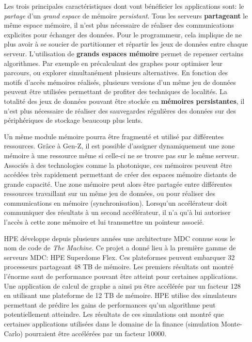         Les trois principales caractéristiques dont vont bénéficier les applications sont: le \textit{partage} d'un \textit{grand espace} de mémoire \textit{persistant}. 
        Tous les serveurs \textbf{partageant} le même espace mémoire, il n'est plus nécessaire de réaliser des communications explicites pour échanger des données. Pour le programmeur, cela implique de ne plus avoir à se soucier de partitionner et répartir les jeux de données entre chaque serveur. 
        L'utilisation de \textbf{grands espaces mémoire} permet de repenser certains algorithmes. Par exemple en précalculant des graphes pour optimiser leur parcours, ou explorer simultanément plusieurs alternatives. En fonction des motifs d'accès mémoires réalisés, plusieurs versions d'un même jeu de données peuvent être utilisées permettant de profiter des techniques de localités.
        La totalité des jeux de données pouvant être stockée en \textbf{mémoires persistantes}, il n'est plus nécessaire de réaliser des sauvegardes régulières des données sur des périphériques de stockage beaucoup plus lents.

        Un même module mémoire pourra être fragmenté et utilisé par différentes ressources. Grâce à Gen-Z, il est possible d'assigner dynamiquement une zone mémoire à une ressource même si celle-ci ne se trouve pas sur le même serveur.  Associés à des technologies comme la photonique, ces mémoires peuvent être accédées très rapidement permettant de créer des espaces mémoire distants de grande capacité. Une zone mémoire peut alors être partagée entre différentes ressources travaillant sur un même jeu de données, ou pour réaliser des communications en mémoire (synchronisation). Lorsqu'un accélérateur doit communiquer des résultats à un second accélérateur, il n'a qu'à lui autoriser l'accès à cette zone mémoire et lui transmettre un pointeur associé.
           
         HPE développe depuis plusieurs années une architecture MDC connue sous le nom de code de \textit{The Machine}. Ce projet a donné lieu à la première gamme de serveurs MDC: HPE Superdome Flex. Ces plateformes peuvent embarquer 32 processeurs partageant 48 TB de mémoire. Les premiers résultats ont montré l'énorme saut de performance pouvant être atteint pour certaines applications. Une application de calcul de graphe \cite{Chen2016a} a ainsi pu être accélérée par un facteur 128 en utilisant une plateforme de 12 TB de mémoire. HPE utilise des simulateurs permettant de prédire les gains de performances qu'un algorithme peut potentiellement atteindre. Les résultats de ces simulations ont montré que certaines applications utilisées dans le domaine de la finance (simulation Monte-Carlo) pourraient être accélérées par un facteur 10000.
   
